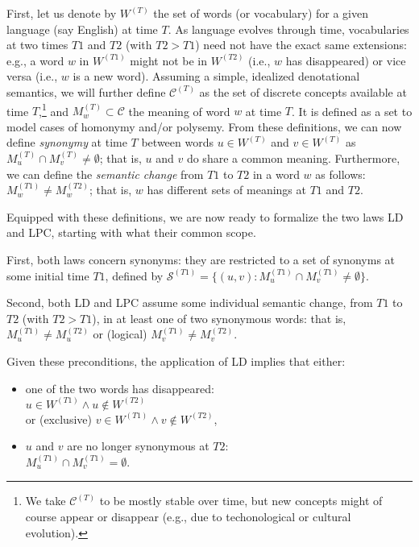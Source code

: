 \documentclass[11pt]{article}
\newcommand{\vocab}{W}
\newcommand{\synonymsSet}{\mathcal{S}}
\begin{document}
First, let us denote by $\vocab^{(T)}$ the set of words (or vocabulary) for a given language (say English) at time $T$. As language evolves through time, vocabularies at two times $T1$ and $T2$ (with $T2>T1$) need not have the exact same extensions: e.g., a word $w$ in $\vocab^{(T1)}$ might not be in $\vocab^{(T2)}$ (i.e., $w$ has disappeared) or vice versa (i.e., $w$ is a new word).  Assuming a simple, idealized denotational semantics, we will further define $\mathcal{C}^{(T)}$ as the set of discrete concepts available at time $T$,\footnote{We take $\mathcal{C}^{(T)}$ to be mostly stable over time, but new concepts might of course appear or disappear (e.g., due to techonological or cultural evolution).} and $M_w^{(T)}\subset \mathcal{C}$ the meaning of word $w$ at time $T$. It is defined as a set to model cases of homonymy and/or polysemy. From these definitions, we can now define \textit{synonymy} at time $T$ between words $u\in\vocab^{(T)}$ and $v\in\vocab^{(T)}$ as $M_u^{(T)}\cap M_v^{(T)}\neq\emptyset$; that is, $u$ and $v$ do share a common meaning. Furthermore, we can define the \textit{semantic change} from $T1$ to $T2$ in a word $w$ as follows: $M_w^{(T1)} \neq M_w^{(T2)}$; that is, $w$ has different sets of meanings at $T1$ and $T2$. 

Equipped with these definitions, we are now ready to formalize the two laws LD and LPC, starting with what their common scope.  


First, both laws concern synonyms: they are restricted to a set of synonyms at some initial time $T1$, defined by $\synonymsSet^{(T1)} = \{(u,v): M_u^{(T1)}\cap M_v^{(T1)}\neq\emptyset\}$. 

Second, both LD and LPC assume some individual semantic change, from $T1$ to $T2$ (with $T2>T1$), in at least one of two synonymous words: that is, $M_u^{(T1)} \neq M_u^{(T2)}$ or (logical) $M_v^{(T1)} \neq M_v^{(T2)}$. 

Given these preconditions, the application of LD implies that either: 
\begin{itemize}
    \item one of the two words has disappeared:\\ $u\in\vocab^{(T1)} \land u\not\in\vocab^{(T2)}$ \\or (exclusive) $v\in\vocab^{(T1)} \land v\not\in\vocab^{(T2)}$, 
    \item $u$ and $v$ are no longer synonymous at $T2$:\\ $M_u^{(T1)}\cap M_v^{(T1)}=\emptyset$.
\end{itemize}
\end{document}
